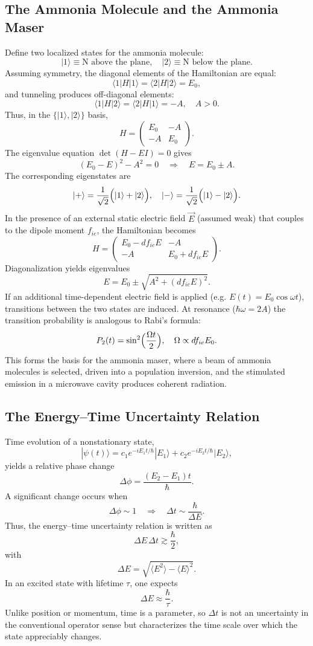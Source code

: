 \documentclass[twocolumn]{article}
\begin{document}
\begin{spacing}{1}
\subsection{The Ammonia Molecule and the Ammonia Maser}
Define two localized states for the ammonia molecule:
\[
|1\rangle\equiv \text{N above the plane},\quad |2\rangle\equiv \text{N below the plane}.
\]
Assuming symmetry, the diagonal elements of the Hamiltonian are equal:
\[
\langle1|H|1\rangle=\langle2|H|2\rangle=E_0,
\]
and tunneling produces off-diagonal elements:
\[
\langle1|H|2\rangle=\langle2|H|1\rangle=-A,\quad A>0.
\]
Thus, in the $\{|1\rangle,|2\rangle\}$ basis,
\[
H=\begin{pmatrix}E_0 & -A\\ -A & E_0\end{pmatrix}.
\]
The eigenvalue equation $\det(H-EI)=0$ gives
\[
(E_0-E)^2-A^2=0\quad\Longrightarrow\quad E=E_0\pm A.
\]
The corresponding eigenstates are
\[
|+\rangle=\frac{1}{\sqrt{2}}\Bigl(|1\rangle+|2\rangle\Bigr),\quad |-\rangle=\frac{1}{\sqrt{2}}\Bigl(|1\rangle-|2\rangle\Bigr).
\]
In the presence of an external static electric field $\vec{E}$ (assumed weak) that couples to the dipole moment $f_{ie}$, the Hamiltonian becomes
\[
H=\begin{pmatrix}E_0-df_{ie}E & -A\\ -A & E_0+df_{ie}E\end{pmatrix}.
\]
Diagonalization yields eigenvalues
\[
E=E_0\pm\sqrt{A^2+(df_{ie}E)^2}.
\]
If an additional time-dependent electric field is applied (e.g. $E(t)=E_0\cos\omega t$), transitions between the two states are induced. At resonance ($\hbar\omega=2A$) the transition probability is analogous to Rabi's formula:
\[
P_{2}(t)=\sin^2\Bigl(\frac{\Omega t}{2}\Bigr),\quad \Omega\propto df_{ie}E_0.
\]
This forms the basis for the ammonia maser, where a beam of ammonia molecules is selected, driven into a population inversion, and the stimulated emission in a microwave cavity produces coherent radiation.

\subsection{The Energy–Time Uncertainty Relation}
Time evolution of a nonstationary state,
\[
|\psi(t)\rangle=c_1e^{-iE_1t/\hbar}|E_1\rangle+c_2e^{-iE_2t/\hbar}|E_2\rangle,
\]
yields a relative phase change
\[
\Delta\phi=\frac{(E_2-E_1)t}{\hbar}.
\]
A significant change occurs when
\[
\Delta\phi\sim 1\quad\Longrightarrow\quad \Delta t\sim\frac{\hbar}{\Delta E}.
\]
Thus, the energy–time uncertainty relation is written as
\[
\Delta E\,\Delta t\gtrsim\frac{\hbar}{2},
\]
with
\[
\Delta E=\sqrt{\langle E^2\rangle-\langle E\rangle^2}.
\]
In an excited state with lifetime $\tau$, one expects
\[
\Delta E\approx\frac{\hbar}{\tau}.
\]
Unlike position or momentum, time is a parameter, so $\Delta t$ is not an uncertainty in the conventional operator sense but characterizes the time scale over which the state appreciably changes.


\end{spacing}
\end{document}
